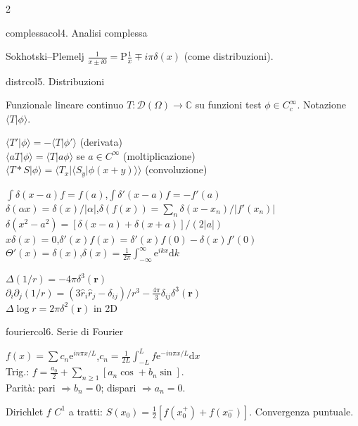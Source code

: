 \documentclass[10pt,a4paper]{article}
\newcommand{\R}{\mathbb{R}}
\newcommand{\C}{\mathbb{C}}
\newcommand{\dd}{\mathrm{d}}
\newcommand{\eu}{\mathrm{e}}
\newcommand{\braket}[2]{\langle#1|#2\rangle}
\begin{document}
\begin{multicols}{2}
\begin{secbox}{complessacol}{4. Analisi complessa}
\begin{teobox}{Sokhotski--Plemelj}
$\frac{1}{x\pm i0}=\mathrm{P}\frac{1}{x}\mp i\pi\delta(x)$ (come distribuzioni).
\end{teobox}

\end{secbox}

\begin{secbox}{distrcol}{5. Distribuzioni}

Funzionale lineare continuo $T:\mathcal D(\Omega)\to\C$ su funzioni test $\phi\in C^\infty_c$. Notazione $\braket{T}{\phi}$.

$\braket{T'}{\phi}=-\braket{T}{\phi'}$ (derivata)\\
$\braket{aT}{\phi}=\braket{T}{a\phi}$ se $a\in C^\infty$ (moltiplicazione)\\
$\braket{T*S}{\phi}=\braket{T_x}{\braket{S_y}{\phi(x+y)}}$ (convoluzione)

$\int\delta(x-a)f=f(a)$,\;$\int\delta'(x-a)f=-f'(a)$\\
$\delta(\alpha x)=\delta(x)/|\alpha|$,\;$\delta(f(x))=\sum_n\delta(x-x_n)/|f'(x_n)|$\\
$\delta(x^2-a^2)=[\delta(x-a)+\delta(x+a)]/(2|a|)$\\
$x\delta(x)=0$,\;$\delta'(x)f(x)=\delta'(x)f(0)-\delta(x)f'(0)$\\
$\Theta'(x)=\delta(x)$,\;$\delta(x)=\frac{1}{2\pi}\int_{-\infty}^{\infty}\eu^{ikx}\dd k$

\sub{Identità in $\R^3$}
$\Delta(1/r)=-4\pi\delta^3(\bm r)$\\
$\partial_i\partial_j(1/r)=(3\hat r_i\hat r_j-\delta_{ij})/r^3-\frac{4\pi}{3}\delta_{ij}\delta^3(\bm r)$\\
$\Delta\log r=2\pi\delta^2(\bm r)$ in 2D

\end{secbox}

\begin{secbox}{fouriercol}{6. Serie di Fourier}

$f(x)=\sum c_n\eu^{in\pi x/L}$,\;$c_n=\frac{1}{2L}\int_{-L}^Lf\eu^{-in\pi x/L}\dd x$\\
Trig.: $f=\frac{a_0}{2}+\sum_{n\ge1}[a_n\cos+b_n\sin]$.\\
Parità: pari $\Rightarrow b_n=0$; dispari $\Rightarrow a_n=0$.

\begin{teobox}{Dirichlet}
$f$ $C^1$ a tratti: $S(x_0)=\frac{1}{2}[f(x_0^+)+f(x_0^-)]$. Convergenza puntuale.
\end{teobox}


\end{secbox}
\end{multicols}
\end{document}
